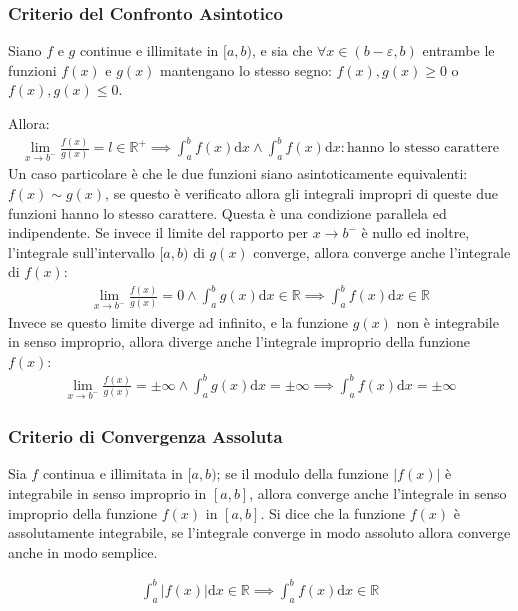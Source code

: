 \documentclass{article}
\newcommand{\df}{\mathrm{d}}
\numberwithin{equation}{subsection}
\begin{document}
\subsubsection{Criterio del Confronto Asintotico}

Siano $f$ e $g$ continue e illimitate in $[a, b)$, e sia che $\forall x\in(b-\varepsilon, b)$ entrambe le funzioni $f(x)$ e $g(x)$ mantengano lo stesso segno: $f(x),g(x)\geq0$ o $f(x),g(x)\leq0$. 

Allora:
\begin{gather}
    \lim_{x\to b^-}\frac{f(x)}{g(x)}=l\in\mathbb{R}^+\implies \int_a^b f(x)\mathrm{d}x\land\int_a^b f(x)\mathrm{d}x:\mbox{hanno lo stesso carattere}
\end{gather}
Un caso particolare è che le due funzioni siano asintoticamente equivalenti: $f(x)\sim g(x)$, se questo è verificato allora gli integrali impropri di queste due funzioni hanno lo stesso carattere. Questa è una condizione parallela ed indipendente. 
Se invece il limite del rapporto per $x\to b^-$ è nullo ed inoltre, l'integrale sull'intervallo $[a,b)$ di $g(x)$ converge, allora converge anche l'integrale di $f(x)$:
\begin{gather}
    \displaystyle\lim_{x\to b^-}\frac{f(x)}{g(x)}=0\land\int_a^bg(x)\mathrm{d}x\in\mathbb{R}\implies\int_a^bf(x)\mathrm{d}x\in\mathbb{R}
\end{gather}
Invece se questo limite diverge ad infinito, e la funzione $g(x)$ non è integrabile in senso improprio, allora diverge anche l'integrale improprio della funzione $f(x)$:
\begin{gather}
    \displaystyle\lim_{x\to b^-}\frac{f(x)}{g(x)}=\pm\infty\land\displaystyle\int_a^bg(x)\mathrm{d}x=\pm\infty\implies\int_a^bf(x)\mathrm{d}x=\pm\infty
\end{gather}

\subsubsection{Criterio di Convergenza Assoluta}

Sia $f$ continua e illimitata in $[a, b)$; se il modulo della funzione $|f(x)|$ è integrabile in senso improprio in $[a,b]$, allora converge anche l'integrale in senso improprio della funzione $f(x)$ in $[a,b]$. Si dice che la funzione $f(x)$ è assolutamente integrabile, se l'integrale converge in modo assoluto allora converge anche in modo semplice. 

\begin{gather}
    \int_a^b |f(x)|\df x\in\mathbb{R}\implies\int_a^bf(x)\df x\in\mathbb{R}
\end{gather}
\end{document}
